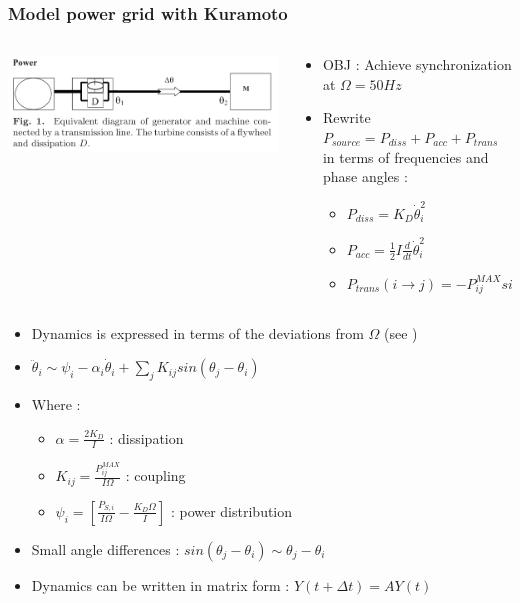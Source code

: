 \documentclass[xcolor=dvipsnames]{beamer}
\begin{document}
\begin{frame}
	\frametitle{Model power grid with Kuramoto}
	
	\begin{scriptsize}
	\begin{columns}
		\begin{column}{.45\textwidth}
			\includegraphics[scale=.45]{line}
		\end{column}
		\begin{column}{.55\textwidth}
			\begin{itemize}
				\item OBJ : Achieve synchronization at $ \Omega = 50Hz $
				\item Rewrite $ P_{source} = P_{diss} + P_{acc} + P_{trans} $ in terms of frequencies and phase angles :
				\begin{itemize}
					\item $ P_{diss} = K_D \dot{\theta}_i^2	$
					\item $ P_{acc} = \frac{1}{2}I\frac{d}{dt}\dot{\theta}_i^2 $	
					\item $P_{trans}(i \rightarrow j) = -P_{ij}^{MAX} sin(\theta_j-\theta_i) $ 
				\end{itemize}
			\end{itemize}
		\end{column}
	\end{columns}
	\begin{itemize}
		\item Dynamics is expressed in terms of the deviations from $ \Omega $ (see )
		\item $ \ddot{\theta}_i \sim \psi_i - \alpha_i \dot{\theta}_i + \sum_{j}K_{ij} sin(\theta_j-\theta_i) $
		\item Where :
			\begin{itemize}
				\item $ \alpha = \frac{2K_D}{I} $ : dissipation
				\item $ K_{ij} = \frac{P_{ij}^{MAX}}{I\Omega} $ : coupling
				\item $ \psi_i = \left[ \frac{P_{S,i}}{I\Omega} - \frac{K_D\Omega}{I} \right] $ : power distribution
			\end{itemize} 
		\item Small angle differences : $sin(\theta_j - \theta_i) \sim \theta_j - \theta_i $
		\item Dynamics can be written in matrix form : $Y(t+\Delta t) = A Y(t)$
	\end{itemize}
	
	\end{scriptsize}
\end{frame}
\end{document}
